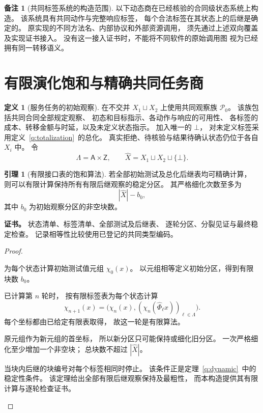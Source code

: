 \documentclass[UTF8,12pt,a4paper,openany,fontset=none,zihao=false]{ctexrep}
\theoremstyle{definition}
\newtheorem{definition}{定义}[chapter]
\newtheorem{lemma}{引理}[chapter]
\newtheorem{remark}{备注}[chapter]
\newenvironment{certificate}{\par\noindent\textbf{证书。}\ignorespaces}{\par}
\newcommand{\1}{\mathbf 1}
\begin{document}
\begin{remark}[共同标签系统的构造范围]
以下动态商在已经核验的合同级状态系统上构造。
该系统具有共同动作与完整响应标签，
每个合法标签在其状态上的后继是确定的。
原实现的不同方法名、内部协议和外部资源调用，
须先通过上述双向覆盖及实现证书接入。
没有这一接入证书时，不能将不同软件的原始调用图
视为已经拥有同一转移语义。
\end{remark}

\section{有限演化饱和与精确共同任务商}

\begin{definition}[服务任务的初始观察]
\label{std:initial-tests}
在不交并 \(X_1\sqcup X_2\) 上使用共同观察族 \(\mathcal P_0\)。
该族包括共同合同全部规定观察、
初态和目标指示、各动作与响应的可用性、
各标签的成本、转移金额与时延，以及未定义状态指示。
加入唯一的 \(\bot\)，
对未定义标签采用定义~\ref{q:totalization}~的总化。
真实拒绝、待核验与结果待确认状态仍位于各自 \(X_i\) 中。
令
\[
\Lambda=\mathsf A\times\mathsf Z,\qquad
\widehat X=X_1\sqcup X_2\sqcup\{\bot\}.
\]
\end{definition}

\begin{lemma}[有限接口表的饱和算法]
\label{std:finite-saturation}
若全部初始测试及总化后继表均可精确计算，
则可以有限计算保持所有有限后继观察的稳定分区。
其严格细化次数至多为
\[
|\widehat X|-b_0,
\]
其中 \(b_0\) 为初始观察分区的非空块数。
\end{lemma}
\begin{certificate}
状态清单、标签清单、全部测试及后继表、
逐轮分区、分裂见证与最终稳定检查。
记录相等性比较使用已登记的共同类型编码。
\end{certificate}
\begin{proof}
\begin{semanticsteps}
\item 为每个状态计算初始测试值元组 \(\chi_0(x)\)。
以元组相等定义初始分区，得到有限块数 \(b_0\)。
\item 已计算第 \(n\) 轮时，
按有限标签表为每个状态计算
\[
\chi_{n+1}(x)=
\bigl(\chi_n(x),
(\chi_n(\widehat\Phi_\ell x))_{\ell\in\Lambda}\bigr).
\]
每个坐标都由已给定有限表取得，
故这一轮是有限算法。
\item 原元组作为新元组的首坐标，
所以新分区只可能保持或细化旧分区。
一次严格细化至少增加一个非空块；
总块数不超过 \(|\widehat X|\)。
\item 当块内后继的块编号对每个标签相同时停止。
该条件正是定理~\ref{q:dynamic}~中的稳定性条件。
该定理给出全部有限后继观察保持及最粗性，
而本构造提供其有限计算与逐轮检查证书。
\end{semanticsteps}
\end{proof}
\end{document}
